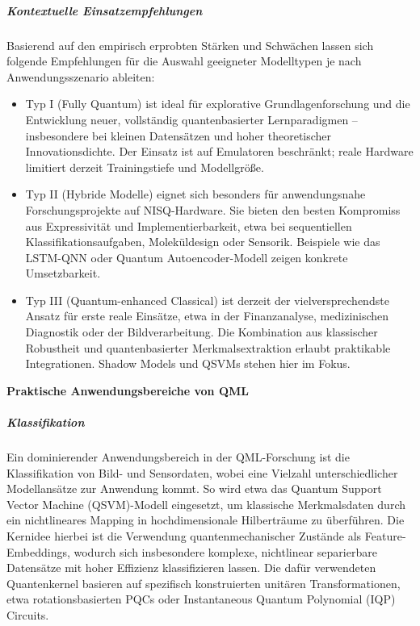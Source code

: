 \subparagraph{Kontextuelle Einsatzempfehlungen}
Basierend auf den empirisch erprobten Stärken und Schwächen lassen sich folgende Empfehlungen für die Auswahl geeigneter Modelltypen je nach Anwendungsszenario ableiten:
\begin{itemize}
  \item Typ I (Fully Quantum) ist ideal für explorative Grundlagenforschung und die Entwicklung neuer, vollständig quantenbasierter Lernparadigmen – insbesondere bei kleinen Datensätzen und hoher theoretischer Innovationsdichte. Der Einsatz ist auf Emulatoren beschränkt; reale Hardware limitiert derzeit Trainingstiefe und Modellgröße.
  \vspace{0.5em}
  \item Typ II (Hybride Modelle) eignet sich besonders für anwendungsnahe Forschungsprojekte auf NISQ-Hardware. Sie bieten den besten Kompromiss aus Expressivität und Implementierbarkeit, etwa bei sequentiellen Klassifikationsaufgaben, Moleküldesign oder Sensorik. Beispiele wie das LSTM-QNN oder Quantum Autoencoder-Modell zeigen konkrete Umsetzbarkeit.
  \vspace{0.5em}
  \item Typ III (Quantum-enhanced Classical) ist derzeit der vielversprechendste Ansatz für erste reale Einsätze, etwa in der Finanzanalyse, medizinischen Diagnostik oder der Bildverarbeitung. Die Kombination aus klassischer Robustheit und quantenbasierter Merkmalsextraktion erlaubt praktikable Integrationen. Shadow Models und QSVMs stehen hier im Fokus.
\end{itemize}


\vspace{1.5em}
\noindent\textbf{Praktische Anwendungsbereiche von QML }

\noindent
\subparagraph{Klassifikation}
Ein dominierender Anwendungsbereich in der QML-Forschung ist die Klassifikation von Bild- und Sensordaten, wobei eine Vielzahl unterschiedlicher Modellansätze zur Anwendung kommt. So wird etwa das Quantum Support Vector Machine (QSVM)-Modell eingesetzt, um klassische Merkmalsdaten durch ein nichtlineares Mapping in hochdimensionale Hilberträume zu überführen. Die Kernidee hierbei ist die Verwendung quantenmechanischer Zustände als Feature-Embeddings, wodurch sich insbesondere komplexe, nichtlinear separierbare Datensätze mit hoher Effizienz klassifizieren lassen. Die dafür verwendeten Quantenkernel basieren auf spezifisch konstruierten unitären Transformationen, etwa rotationsbasierten PQCs oder Instantaneous Quantum Polynomial (IQP) Circuits. \cite{peral-garciaSystematicLiteratureReview2024}

